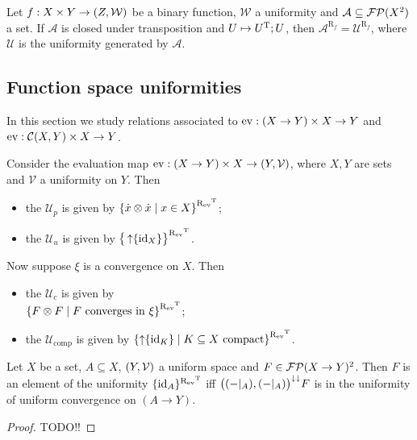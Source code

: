 \begin{lemma}
Let $f: X\times Y\to \sSet{Z, \mathcal{W}}$ be a binary function, $\mathcal{W}$ a uniformity and $\mathcal{A}\subseteq \operatorname{\mathcal{FP}}(X^2)$ a set. If $\mathcal{A}$ is closed under transposition and $U\mapsto U^{\mathrm{T}};U$, then $\mathcal{A}^{\mathrm{R}_{f}} = \mathcal{U}^{\mathrm{R}_{f}}$, where $\mathcal{U}$ is the uniformity generated by $\mathcal{A}$.
\end{lemma}

\subsection{Function space uniformities}
In this section we study relations associated to $\operatorname{ev}: (X\to Y) \times X \to Y$ and $\operatorname{ev}: \operatorname{\mathcal{C}}(X, Y) \times X \to Y$.

\begin{definition}
Consider the evaluation map $\evalMap: (X\to Y)\times X \to \sSet{Y,\mathcal{V}}$, where $X, Y$ are sets and $\mathcal{V}$ a uniformity on $Y$. Then
\begin{itemize}
\item the  $\mathcal{U}_p$ is given by $\setbuilder{\pfilter{x}\otimes\pfilter{x}}{x\in X}^{\uRelEv^\transp}$;
\item the  $\mathcal{U}_u$ is given by $\big\{\operatorname{\uparrow}\{\operatorname{id}_X\}\big\}^{\mathrel{\mathrm{R}_{\operatorname{ev}}}^{\mathrm{T}}}$.
\end{itemize}
Now suppose $\xi$ is a convergence on $X$. Then
\begin{itemize}
\item the  $\mathcal{U}_c$ is given by \\ $\setbuilder{F\otimes F}{\text{$F$ converges in $\xi$}}^{\uRelEv^\transp}$;
\item the  $\mathcal{U}_\text{comp}$ is given by $\setbuilder{\upset\{\id_K\}}{\text{$K\subseteq X$ compact}}^{\uRelEv^\transp}$.
\end{itemize}
\end{definition}

\begin{lemma}
Let $X$ be a set, $A\subseteq X$, $\sSet{Y, \mathcal{V}}$ a uniform space and $F\in\operatorname{\mathcal{FP}}(X\to Y)^2$. Then $F$ is an element of the uniformity $\{\operatorname{id}_A\}^{\mathrel{\mathrm{R}_{\operatorname{ev}}}^{\mathrm{T}}}$ iff $\big((-|_A), (-|_A)\big)^{\downarrow\downarrow}F$ is in the uniformity of uniform convergence on $(A\to Y)$.
\end{lemma}
\begin{proof}
TODO!!
\end{proof}

